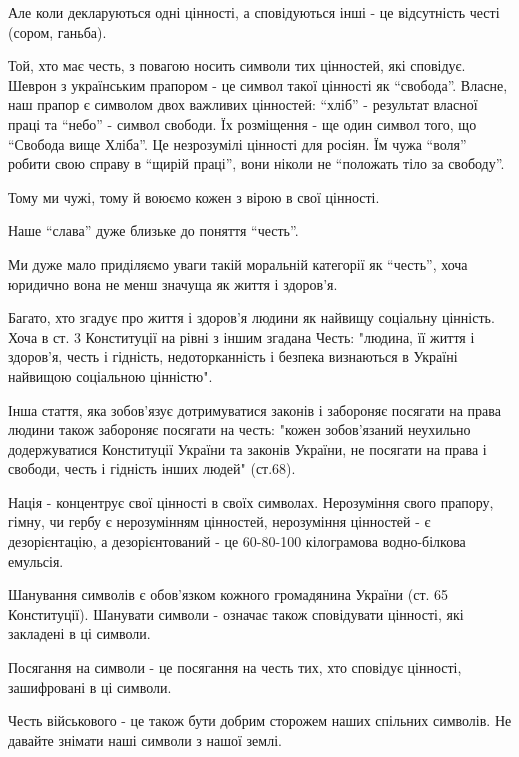 \begin{itemize}
\begin{multicols}{2}
Але коли декларуються одні цінності, а сповідуються інші - це відсутність честі
(сором, ганьба).

Той, хто має честь, з повагою носить символи тих цінностей, які сповідує.
Шеврон з українським прапором - це символ такої цінності як \enquote{свобода}. Власне,
наш прапор є символом двох важливих цінностей: \enquote{хліб} - результат власної праці
та \enquote{небо} - символ свободи. Їх розміщення - ще один символ того, що \enquote{Свобода
вище Хліба}. Це незрозумілі цінності для росіян. Їм чужа \enquote{воля} робити свою
справу в \enquote{щирій праці}, вони ніколи не \enquote{положать тіло за свободу}.

Тому ми чужі, тому й воюємо кожен з вірою в свої цінності.

Наше \enquote{слава} дуже близьке до поняття \enquote{честь}.

Ми дуже мало приділяємо уваги такій моральній категорії як \enquote{честь}, хоча
юридично вона не менш значуща як життя і здоров'я.

Багато, хто згадує про життя і здоров'я людини як найвищу соціальну цінність.
Хоча в ст. 3 Конституції на рівні з іншим згадана Честь: "людина, її життя і
здоров'я, честь і гідність, недоторканність і безпека визнаються в Україні
найвищою соціальною цінністю".

Інша стаття, яка зобов'язує дотримуватися законів і забороняє посягати на права
людини також забороняє посягати на честь: "кожен зобов'язаний неухильно
додержуватися Конституції України та законів України, не посягати на права і
свободи, честь і гідність інших людей" (ст.68).


 
Нація - концентрує свої цінності в своїх символах. Нерозуміння свого прапору, гімну, чи гербу є нерозумінням цінностей, нерозуміння цінностей - є дезорієнтацію, а дезорієнтований - це 60-80-100 кілограмова водно-білкова емульсія.

Шанування символів є обов'язком кожного громадянина України (ст. 65 Конституції). Шанувати символи - означає також сповідувати цінності, які закладені в ці символи.

Посягання на символи - це посягання на честь тих, хто сповідує цінності, зашифровані в ці символи.

Честь військового - це також бути добрим сторожем наших спільних символів. Не давайте знімати наші символи з нашої землі.

\end{multicols} %




\end{itemize} %

